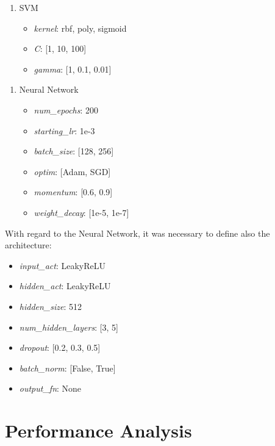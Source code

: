 \documentclass[../main]{subfiles}
\begin{document}
\begin{enumerate}[label=3.\arabic*]
    \item SVM
    \begin{itemize}
        \item \textit{kernel}: rbf, poly, sigmoid
        \item \textit{C}: [1, 10, 100]
        \item \textit{gamma}: [1, 0.1, 0.01]
    \end{itemize}
\end{enumerate}

\begin{enumerate}[label=4.\arabic*]
    \item Neural Network
    \begin{itemize}
        \item \textit{num\_epochs}: 200
        \item \textit{starting\_lr}: 1e-3
        \item \textit{batch\_size}: [128, 256]
        \item \textit{optim}: [Adam, SGD]
        \item \textit{momentum}: [0.6, 0.9]
        \item \textit{weight\_decay}: [1e-5, 1e-7]
    \end{itemize}
\end{enumerate}

With regard to the Neural Network, it was necessary to define also the architecture:
\begin{itemize}
    \item \textit{input\_act}: LeakyReLU
    \item \textit{hidden\_act}: LeakyReLU
    \item \textit{hidden\_size}: 512
    \item \textit{num\_hidden\_layers}: [3, 5]
    \item \textit{dropout}: [0.2, 0.3, 0.5]
    \item \textit{batch\_norm}: [False, True]
    \item \textit{output\_fn}: None
\end{itemize}

\section{Performance Analysis}
\end{document}
